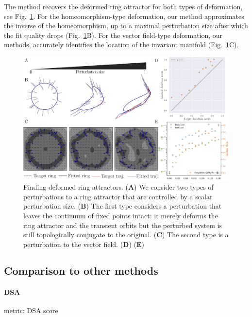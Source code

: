 \documentclass{article}
\theoremstyle{definition} \newtheorem{definition}{Definition}  \newtheorem{example}{Example}
\theoremstyle{remark} \newtheorem{remark}{Remark}
\newcounter{ct}
\begin{document}
The method recovers the deformed ring attractor for both types of deformation, see Fig.~\ref{fig:ring_pert_fig}.
For the homeomorphism-type deformation, our method approximates the inverse of the homeomorphism, up to a maximal perturbation size after which the fit quality drops (Fig.~\ref{fig:ring_pert_fig}B).
For the vector field-type deformation, our methods, accurately identifies the location of the invariant manifold (Fig.~\ref{fig:ring_pert_fig}C).


\begin{figure}[htbp]
    \centering
    \includegraphics[width=.9\linewidth]{ring_pert_fig}
    \caption{Finding deformed ring attractors. 
    (\textbf{A}) We consider two types of perturbations to a ring attractor that are controlled by a scalar perturbation size. 
    (\textbf{B}) The first type considers a perturbation that leaves the continuum of fixed points intact: it merely deforms the ring attractor and the transient orbits but the perturbed system is still topologically conjugate to the original. 
    (\textbf{C}) The second type is a perturbation to the vector field. 
    (\textbf{D}) 
    (\textbf{E}) 
    }
    \label{fig:ring_pert_fig}
\end{figure}




\subsection{Comparison to other methods}\label{sec:compare_method}

\paragraph{DSA}%
metric: DSA score
\end{document}
